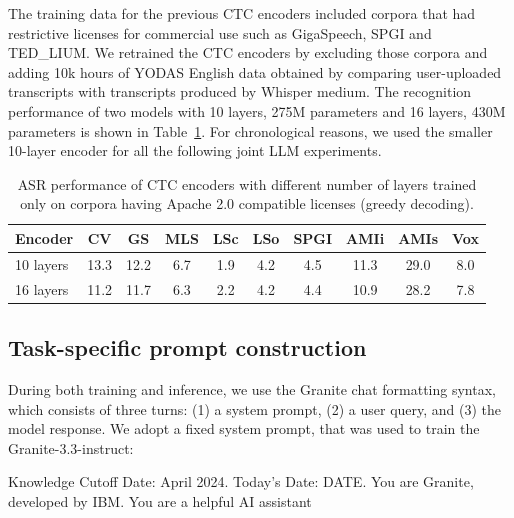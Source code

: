 \documentclass[9pt,conference]{IEEEtran}
\renewenvironment{quote}
  {\list{}{\leftmargin=1em \rightmargin=0.1em}\item\relax\small\ttfamily}
  {\endlist}
\begin{document}
The training data for the previous CTC encoders included corpora that had restrictive licenses for commercial use such as GigaSpeech, SPGI and TED\_LIUM. We retrained the CTC encoders by excluding those corpora and adding 10k hours of YODAS English data obtained by comparing user-uploaded transcripts with transcripts produced by Whisper medium. The recognition performance of two models with 10 layers, 275M parameters and 16 layers, 430M parameters is shown in Table~\ref{ctc-wer}. For chronological reasons, we used the smaller 10-layer encoder for all the following joint LLM experiments. 

\begin{table}[htb]
\begin{center}
\begin{tabular}{|l|c|c|c|c|c|c|c|c|c|}\hline
Encoder   &  CV  & GS & MLS & LSc & LSo & SPGI & AMIi & AMIs & Vox\\ \hline
10 layers &  13.3 &12.2 &6.7 &1.9 & 4.2 &  4.5 & 11.3 & 29.0 & 8.0\\ \hline
16 layers &  11.2 &11.7 &6.3 &2.2 & 4.2 &  4.4 & 10.9 & 28.2 & 7.8\\ \hline
\end{tabular}
\end{center}
\caption{\label{ctc-wer}ASR performance of CTC encoders with different number of layers trained only on corpora having Apache 2.0 compatible licenses (greedy decoding).}
\end{table}

\subsection{Task-specific prompt construction}
During both training and inference, we use the Granite chat formatting syntax, which consists of three turns: (1) a system prompt, (2) a user query, and (3) the model response. 
We adopt a fixed system prompt, that was used to train the Granite-3.3-instruct:
\begin{quote}
Knowledge Cutoff Date: April 2024. Today's Date: DATE. 
You are Granite, developed by IBM. You are a helpful AI assistant
\end{quote}
\end{document}
